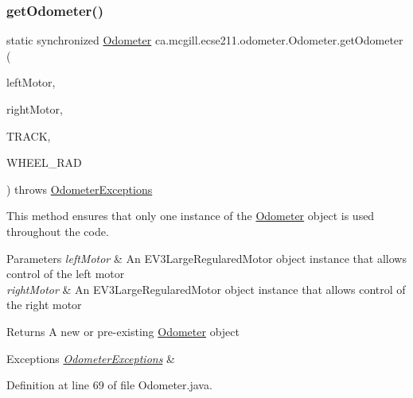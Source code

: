 \subsubsection{\texorpdfstring{get\+Odometer()}{getOdometer()}\hspace{0.1cm}{\footnotesize\ttfamily [1/2]}}
{\footnotesize\ttfamily static synchronized \hyperlink{classca_1_1mcgill_1_1ecse211_1_1odometer_1_1_odometer}{Odometer} ca.\+mcgill.\+ecse211.\+odometer.\+Odometer.\+get\+Odometer (\begin{DoxyParamCaption}\item[{E\+V3\+Large\+Regulated\+Motor}]{left\+Motor,  }\item[{E\+V3\+Large\+Regulated\+Motor}]{right\+Motor,  }\item[{final double}]{T\+R\+A\+CK,  }\item[{final double}]{W\+H\+E\+E\+L\+\_\+\+R\+AD }\end{DoxyParamCaption}) throws \hyperlink{classca_1_1mcgill_1_1ecse211_1_1odometer_1_1_odometer_exceptions}{Odometer\+Exceptions}\hspace{0.3cm}{\ttfamily [static]}}

This method ensures that only one instance of the \hyperlink{classca_1_1mcgill_1_1ecse211_1_1odometer_1_1_odometer}{Odometer} object is used throughout the code.


\begin{DoxyParams}{Parameters}
{\em left\+Motor} & An E\+V3\+Large\+Regulared\+Motor object instance that allows control of the left motor \\
\hline
{\em right\+Motor} & An E\+V3\+Large\+Regulared\+Motor object instance that allows control of the right motor \\
\hline
\end{DoxyParams}
\begin{DoxyReturn}{Returns}
A new or pre-\/existing \hyperlink{classca_1_1mcgill_1_1ecse211_1_1odometer_1_1_odometer}{Odometer} object 
\end{DoxyReturn}

\begin{DoxyExceptions}{Exceptions}
{\em \hyperlink{classca_1_1mcgill_1_1ecse211_1_1odometer_1_1_odometer_exceptions}{Odometer\+Exceptions}} & \\
\hline
\end{DoxyExceptions}


Definition at line 69 of file Odometer.\+java.


